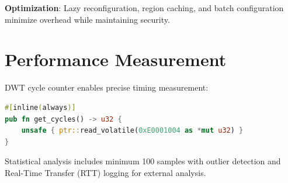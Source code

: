 \textbf{Optimization}: Lazy reconfiguration, region caching, and batch configuration minimize overhead while maintaining security.

\section{Performance Measurement}

DWT cycle counter enables precise timing measurement:

\begin{lstlisting}[language=Rust, caption=Cycle Counter Implementation, basicstyle=\tiny\ttfamily]
#[inline(always)]
pub fn get_cycles() -> u32 {
    unsafe { ptr::read_volatile(0xE0001004 as *mut u32) }
}
\end{lstlisting}

Statistical analysis includes minimum 100 samples with outlier detection and Real-Time Transfer (RTT) logging for external analysis.